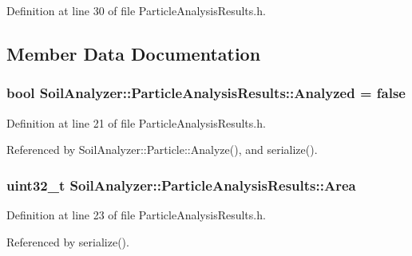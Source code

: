 Definition at line 30 of file Particle\+Analysis\+Results.\+h.



\subsection{Member Data Documentation}
\hypertarget{class_soil_analyzer_1_1_particle_analysis_results_abfb8465c0cfbe9a6ad4d844f6269676f}{}
\subsubsection[{Analyzed}]{\setlength{\rightskip}{0pt plus 5cm}bool Soil\+Analyzer\+::\+Particle\+Analysis\+Results\+::\+Analyzed = false}\label{class_soil_analyzer_1_1_particle_analysis_results_abfb8465c0cfbe9a6ad4d844f6269676f}


Definition at line 21 of file Particle\+Analysis\+Results.\+h.



Referenced by Soil\+Analyzer\+::\+Particle\+::\+Analyze(), and serialize().

\hypertarget{class_soil_analyzer_1_1_particle_analysis_results_a1a6dbe8880b29f51ba3d8ec28b96ed45}{}
\subsubsection[{Area}]{\setlength{\rightskip}{0pt plus 5cm}uint32\+\_\+t Soil\+Analyzer\+::\+Particle\+Analysis\+Results\+::\+Area}\label{class_soil_analyzer_1_1_particle_analysis_results_a1a6dbe8880b29f51ba3d8ec28b96ed45}


Definition at line 23 of file Particle\+Analysis\+Results.\+h.



Referenced by serialize().

\hypertarget{class_soil_analyzer_1_1_particle_analysis_results_a75230aa0675b2df489c08bcfffb43b97}{}
